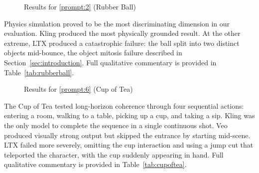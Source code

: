 \documentclass[sigconf]{acmart}
\begin{document}
\begin{figure}[H]
    \centering
    \caption{Results for \ref{prompt:2} (Rubber Ball)}
    \label{fig:eval_prompt_2}
\end{figure}

\noindent Physics simulation proved to be the most discriminating
dimension in our evaluation. Kling produced the most physically
grounded result. At the other extreme, LTX
produced a catastrophic failure: the ball split into two distinct
objects mid-bounce, the object mitosis failure described in
Section~\ref{sec:introduction}. Full qualitative commentary is provided
in Table~\ref{tab:rubberball}.

\begin{figure}[H]
    \centering
    \caption{Results for \ref{prompt:6} (Cup of Tea)}
    \label{fig:eval_prompt_3}
\end{figure}

\noindent The Cup of Tea tested long-horizon coherence through four sequential actions: entering a room, walking to a table, picking up a cup, and taking a sip. Kling was the only model to complete the sequence in a single continuous shot. Veo produced visually strong output but skipped the entrance by starting mid-scene. LTX failed more severely, omitting the cup interaction and using a jump cut that teleported the character, with the cup suddenly appearing in hand. Full qualitative commentary is provided in Table~\ref{tab:cupoftea}.
\end{document}
